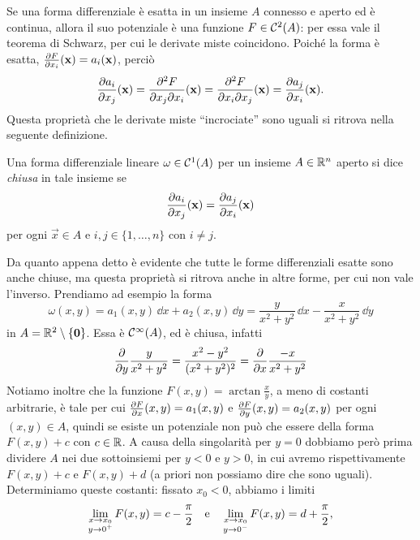 Se una forma differenziale è esatta in un insieme $A$ connesso e aperto ed è continua, allora il suo potenziale è una funzione $F\in\mathcal{C}^{{2}}(A)$: per essa vale il teorema di Schwarz, per cui le derivate miste coincidono.
Poiché la forma è esatta, $\frac{\partial {F}}{\partial {x_i}}(\mathbf{x})=a_i(\mathbf{x})$, perciò
\begin{equation}
	\frac{\partial {a_i}}{\partial {x_j}}(\mathbf{x})=\frac{\partial^2 F}{\partial x_j\partial x_i}(\mathbf{x})=\frac{\partial^2 F}{\partial x_i\partial x_j}(\mathbf{x})=\frac{\partial {a_j}}{\partial {x_i}}(\mathbf{x}).
\end{equation}
Questa proprietà che le derivate miste ``incrociate'' sono uguali si ritrova nella seguente definizione.
\begin{definizione} \label{d:forma-diff-chiusa}
	Una forma differenziale lineare $\omega\in\mathcal{C}^{{1}}(A)$ per un insieme $A\in\mathbb{R}^n$ aperto si dice \emph{chiusa} in tale insieme se
	\begin{equation}
		\frac{\partial {a_i}}{\partial {x_j}}(\mathbf{x})=\frac{\partial {a_j}}{\partial {x_i}}(\mathbf{x})
	\end{equation}
	per ogni $\vec x\in A$ e $i,j\in\{1,\dots,n\}$ con $i\neq j$.
\end{definizione}
Da quanto appena detto è evidente che tutte le forme differenziali esatte sono anche chiuse, ma questa proprietà si ritrova anche in altre forme, per cui non vale l'inverso.
Prendiamo ad esempio la forma
\begin{equation*}
	\omega(x,y)=a_1(x,y)\,\dd x+a_2(x,y)\,\dd y=\frac{y}{x^2+y^2}\,\dd x-\frac{x}{x^2+y^2}\,\dd y
\end{equation*}
in $A=\mathbb{R}^2\setminus\{\mathbf{0}\}$.
Essa è $\mathcal{C}^{{\infty}}(A)$, ed è chiusa, infatti
\begin{equation}
	\frac{\partial {}}{\partial {y}}\frac{y}{x^2+y^2}=\frac{x^2-y^2}{(x^2+y^2)^2}=\frac{\partial {}}{\partial {x}}\frac{-x}{x^2+y^2}
\end{equation}
Notiamo inoltre che la funzione $F(x,y)=\arctan\frac{x}{y}$, a meno di costanti arbitrarie, è tale per cui $\frac{\partial {F}}{\partial {x}}(x,y)=a_1(x,y)$ e $\frac{\partial {F}}{\partial {y}}(x,y)=a_2(x,y)$ per ogni $(x,y)\in A$, quindi se esiste un potenziale non può che essere della forma $F(x,y)+c$ con $c\in\mathbb{R}$.
A causa della singolarità per $y=0$ dobbiamo però prima dividere $A$ nei due sottoinsiemi per $y<0$ e $y>0$, in cui avremo rispettivamente $F(x,y)+c$ e $F(x,y)+d$ (a priori non possiamo dire che sono uguali).
Determiniamo queste costanti: fissato $x_0<0$, abbiamo i limiti
\begin{equation}
	\lim_{\substack{x\to x_0\\ y\to 0^+}}F(x,y)=c-\frac{\pi}2\quad\text{e}\quad\lim_{\substack{x\to x_0\\ y\to 0^-}}F(x,y)=d+\frac{\pi}2,
\end{equation}
